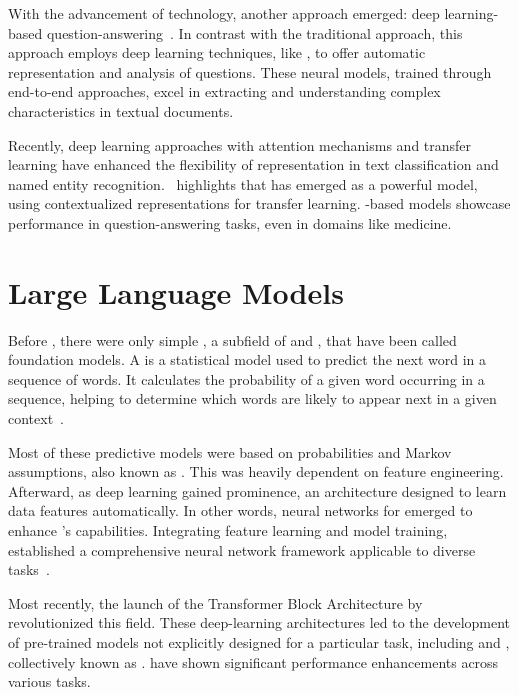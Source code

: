 With the advancement of technology, another approach emerged: deep learning-based question-answering~\cite{chizhik_challenges_2020}. In contrast with the traditional approach, this approach employs deep learning techniques, like {\rnn}, to offer automatic representation and analysis of questions. These neural models, trained through end-to-end approaches, excel in extracting and understanding complex characteristics in textual documents.

Recently, deep learning approaches with attention mechanisms and transfer learning have enhanced the flexibility of representation in text classification and named entity recognition.~\citet{zhong_building_2020} highlights {\bert} that has emerged as a powerful model, using contextualized representations for transfer learning. {\bert}-based models showcase performance in question-answering tasks, even in domains like medicine.



\section{Large Language Models}
\label{llm}

Before {\llm}, there were only simple {\lm}, a subfield of {\nlp} and {\ai}, that have been called foundation models. A {\lm} is a statistical model used to predict the next word in a sequence of words. It calculates the probability of a given word occurring in a sequence, helping to determine which words are likely to appear next in a given context~\cite{chang_language_2023}.

Most of these predictive models were based on probabilities and Markov assumptions, also known as {\slm}. This was heavily dependent on feature engineering. Afterward, as deep learning gained prominence, an architecture designed to learn data features automatically. In other words, neural networks for {\nlp} emerged to enhance {\lm}'s capabilities. Integrating feature learning and model training, {\nlm} established a comprehensive neural network framework applicable to diverse {\nlp} tasks~\cite{liu_prompting_nodate}.

Most recently, the launch of the Transformer Block Architecture by~\citet{vaswani_attention_2023} revolutionized this field. These deep-learning architectures led to the development of pre-trained models not explicitly designed for a particular task, including {\bert} and {\gpt}, collectively known as {\plm}. {\plm} have shown significant performance enhancements across various {\nlp} tasks.

